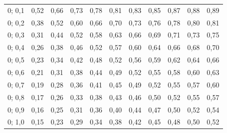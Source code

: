 \begin{table}[b]
\begin{center}
\begin{tabular}{|c|c|c|c|c|c|c|c|c|c|c|}
\hline


 0;  0,1& 0,52& 0,66& 0,73& 0,78& 0,81& 0,83& 0,85& 0,87& 0,88& 0,89\\


 0;  0,2& 0,38& 0,52& 0,60& 0,66& 0,70& 0,73& 0,76& 0,78& 0,80& 0,81\\


 0;  0,3& 0,31& 0,44& 0,52& 0,58& 0,63& 0,66& 0,69& 0,71& 0,73& 0,75\\


 0;  0,4& 0,26& 0,38& 0,46& 0,52& 0,57& 0,60& 0,64& 0,66& 0,68& 0,70\\


 0;  0,5& 0,23& 0,34& 0,42& 0,48& 0,52& 0,56& 0,59& 0,62& 0,64& 0,66\\


 0;  0,6& 0,21& 0,31& 0,38& 0,44& 0,49& 0,52& 0,55& 0,58& 0,60& 0,63\\


 0;  0,7& 0,19& 0,28& 0,36& 0,41& 0,45& 0,49& 0,52& 0,55& 0,57& 0,60\\


 0;  0,8& 0,17& 0,26& 0,33& 0,38& 0,43& 0,46& 0,50& 0,52& 0,55& 0,57\\


 0;  0,9& 0,16& 0,25& 0,31& 0,36& 0,40& 0,44& 0,47& 0,50& 0,52& 0,54\\


 0;  1,0& 0,15& 0,23& 0,29& 0,34& 0,38& 0,42& 0,45& 0,48& 0,50& 0,52\\


\hline


\end{tabular}


\end{center}


\end{table}





